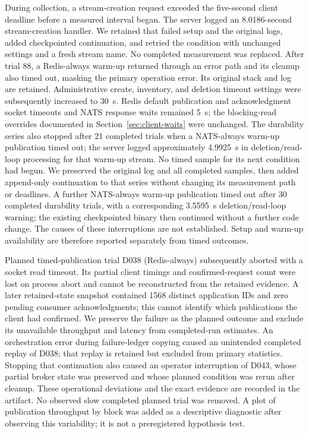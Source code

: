 \documentclass[11pt]{article}
\theoremstyle{definition}
\begin{document}
During collection, a stream-creation request exceeded the five-second client deadline before a measured interval began. The server logged an 8.0186-second stream-creation handler. We retained that failed setup and the original logs, added checkpointed continuation, and retried the condition with unchanged settings and a fresh stream name. No completed measurement was replaced. After trial 88, a Redis-always warm-up returned through an error path and its cleanup also timed out, masking the primary operation error. Its original stack and log are retained. Administrative create, inventory, and deletion timeout settings were subsequently increased to 30~s. Redis default publication and acknowledgment socket timeouts and NATS response waits remained 5~s; the blocking-read overrides documented in Section~\ref{sec:client-waits} were unchanged. The durability series also stopped after 21 completed trials when a NATS-always warm-up publication timed out; the server logged approximately 4.9925~s in deletion/read-loop processing for that warm-up stream. No timed sample for its next condition had begun. We preserved the original log and all completed samples, then added append-only continuation to that series without changing its measurement path or deadlines. A further NATS-always warm-up publication timed out after 30 completed durability trials, with a corresponding 3.5595~s deletion/read-loop warning; the existing checkpointed binary then continued without a further code change. The causes of these interruptions are not established. Setup and warm-up availability are therefore reported separately from timed outcomes.

Planned timed-publication trial D038 (Redis-always) subsequently aborted with a socket read timeout. Its partial client timings and confirmed-request count were lost on process abort and cannot be reconstructed from the retained evidence. A later retained-state snapshot contained 1568 distinct application IDs and zero pending consumer acknowledgments; this cannot identify which publications the client had confirmed. We preserve the failure as the planned outcome and exclude its unavailable throughput and latency from completed-run estimates. An orchestration error during failure-ledger copying caused an unintended completed replay of D038; that replay is retained but excluded from primary statistics. Stopping that continuation also caused an operator interruption of D043, whose partial broker state was preserved and whose planned condition was rerun after cleanup. These operational deviations and the exact evidence are recorded in the artifact. No observed slow completed planned trial was removed. A plot of publication throughput by block was added as a descriptive diagnostic after observing this variability; it is not a preregistered hypothesis test.
\end{document}
